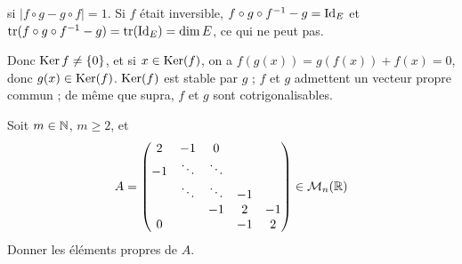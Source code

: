 \begin{solution}
\begin{remarkbox}
si $|f\circ g-g\circ f|=1$.
Si $f$ était inversible, $f\circ g\circ f^{-1}-g=\operatorname{Id}_E$ et
$\operatorname{tr}(f\circ g\circ f^{-1}-g)=\operatorname{tr}(\operatorname{Id}_E)=\dim E$, ce qui ne peut pas.

Donc $\operatorname{Ker} f\neq\{0\}$, et si $x\in\operatorname{Ker}(f)$, on a
$f(g(x))=g(f(x))+f(x)=0$, donc $g(x)\in\operatorname{Ker}(f)$.
$\operatorname{Ker}(f)$ est stable par $g$ ; $f$ et $g$ admettent un vecteur propre commun ;
de même que supra, $f$ et $g$ sont cotrigonalisables.
\end{remarkbox}
\end{solution}


\begin{statementbox}
Soit $m\in\mathbb N$, $m\geq2$, et
\[
A=\begin{pmatrix}
2&-1&0& & \\
-1&\ddots&\ddots& & \\
 &\ddots&\ddots&-1& \\
 & &-1&2&-1\\
0& & &-1&2
\end{pmatrix}\in\mathcal M_n(\mathbb R)
\]
Donner les éléments propres de $A$.
\end{statementbox}

